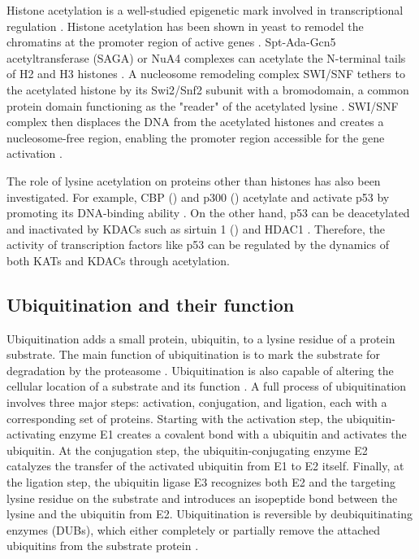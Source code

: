 Histone acetylation is a well-studied epigenetic mark involved in transcriptional regulation \cite{shahbazianmd_grunsteinm:FunctionsSiteSpecific2007,alii_ottm:LysineAcetylation2018}. Histone acetylation has been shown in yeast to remodel the chromatins at the promoter region of active genes \cite{suganumat_workmanjl:SignalsCombinatorial2011}. Spt-Ada-Gcn5 acetyltransferase (SAGA) or NuA4 complexes can acetylate the N-terminal tails of H2 and H3 histones \cite{hassanah_workmanjl:HistoneAcetyltransferase2001}. A nucleosome remodeling complex SWI/SNF tethers to the acetylated histone by its Swi2/Snf2 subunit with a bromodomain, a common protein domain functioning as the "reader" of the acetylated lysine \cite{awads_hassanah:Swi2Snf22008}. SWI/SNF complex then displaces the DNA from the acetylated histones and creates a nucleosome-free region, enabling the promoter region accessible for the gene activation \cite{awads_hassanah:Swi2Snf22008}.

The role of lysine acetylation on proteins other than histones has also been investigated. For example, CBP () and p300 () acetylate and activate p53 by promoting its DNA-binding ability \cite{scolnickdm_halazonetistd:CREBbindingProtein1997,brookscl_guw:ImpactAcetylation2011}. On the other hand, p53 can be deacetylated and inactivated by KDACs such as sirtuin 1 () and HDAC1 \cite{brookscl_guw:ImpactAcetylation2011,luoj_guw:DeacetylationP532000}. Therefore, the activity of transcription factors like p53 can be regulated by the dynamics of both KATs and KDACs through acetylation.


\subsection{Ubiquitination and their function}
Ubiquitination adds a small protein, ubiquitin, to a lysine residue of a protein substrate. The main function of ubiquitination is to mark the substrate for degradation by the proteasome \cite{komanderd_rapem:UbiquitinCode2012}. Ubiquitination is also capable of altering the cellular location of a substrate \cite{mukhopadhyayd_riezmanh:ProteasomeIndependentFunctions2007} and its function \cite{schnelljd_hickel:NontraditionalFunctions2003}. A full process of ubiquitination involves three major steps: activation, conjugation, and ligation, each with a corresponding set of proteins. Starting with the activation step, the ubiquitin-activating enzyme E1 creates a covalent bond with a ubiquitin and activates the ubiquitin. At the conjugation step, the ubiquitin-conjugating enzyme E2 catalyzes the transfer of the activated ubiquitin from E1 to E2 itself. Finally, at the ligation step, the ubiquitin ligase E3 recognizes both E2 and the targeting lysine residue on the substrate and introduces an isopeptide bond between the lysine and the ubiquitin from E2. Ubiquitination is reversible by deubiquitinating enzymes (DUBs), which either completely or partially remove the attached ubiquitins from the substrate protein \cite{reyes-turcufe_wilkinsonkd:RegulationCellular2009}.



